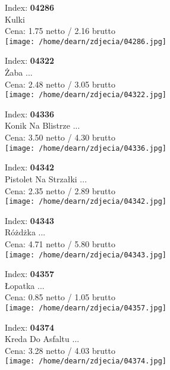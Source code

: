 {Index: \textbf{04286}\\
Kulki\\
Cena: 1.75 netto / 2.16 brutto\\
  \texttt{[image: /home/dearn/zdjecia/04286.jpg]}}\newline\newline

{Index: \textbf{04322}\\
Żaba                      ...\\
Cena: 2.48 netto / 3.05 brutto\\
  \texttt{[image: /home/dearn/zdjecia/04322.jpg]}}\newline\newline

{Index: \textbf{04336}\\
Konik Na Blistrze         ...\\
Cena: 3.50 netto / 4.30 brutto\\
  \texttt{[image: /home/dearn/zdjecia/04336.jpg]}}\newline\newline

{Index: \textbf{04342}\\
Pistolet Na Strzałki      ...\\
Cena: 2.35 netto / 2.89 brutto\\
  \texttt{[image: /home/dearn/zdjecia/04342.jpg]}}\newline\newline

{Index: \textbf{04343}\\
Różdżka                   ...\\
Cena: 4.71 netto / 5.80 brutto\\
  \texttt{[image: /home/dearn/zdjecia/04343.jpg]}}\newline\newline

{Index: \textbf{04357}\\
Łopatka                   ...\\
Cena: 0.85 netto / 1.05 brutto\\
  \texttt{[image: /home/dearn/zdjecia/04357.jpg]}}\newline\newline

{Index: \textbf{04374}\\
Kreda Do Asfaltu          ...\\
Cena: 3.28 netto / 4.03 brutto\\
  \texttt{[image: /home/dearn/zdjecia/04374.jpg]}}\newline\newline

